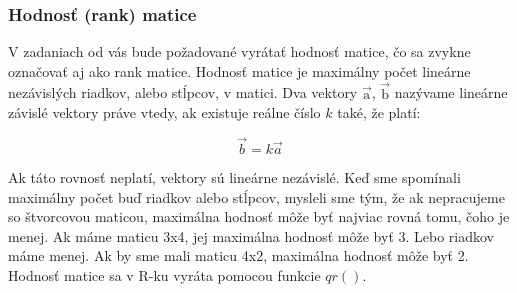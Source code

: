 \documentclass[]{article}
\newenvironment{Shaded}{\begin{snugshade}}{\end{snugshade}}
\newcommand{\CommentTok}[1]{\textcolor[rgb]{0.56,0.35,0.01}{\textit{#1}}}
\newcommand{\DecValTok}[1]{\textcolor[rgb]{0.00,0.00,0.81}{#1}}
\newcommand{\KeywordTok}[1]{\textcolor[rgb]{0.13,0.29,0.53}{\textbf{#1}}}
\newcommand{\NormalTok}[1]{#1}
\newcommand{\OperatorTok}[1]{\textcolor[rgb]{0.81,0.36,0.00}{\textbf{#1}}}
\newcommand{\StringTok}[1]{\textcolor[rgb]{0.31,0.60,0.02}{#1}}
\begin{document}
\hypertarget{hodnosux165-rank-matice}{%
\subsubsection{Hodnosť (rank) matice}\label{hodnosux165-rank-matice}}

V zadaniach od vás bude požadované vyrátať hodnosť matice, čo sa zvykne
označovať aj ako rank matice. Hodnosť matice je maximálny počet lineárne
nezávislých riadkov, alebo stĺpcov, v matici. Dva vektory
\(\overrightarrow{\text{a}}\), \(\overrightarrow{\text{b}}\) nazývame
lineárne závislé vektory práve vtedy, ak existuje reálne číslo \(k\)
také, že platí:

\[\overrightarrow{b} = k\overrightarrow{a}\]

Ak táto rovnosť neplatí, vektory sú lineárne nezávislé. Keď sme
spomínali maximálny počet buď riadkov alebo stĺpcov, mysleli sme tým, že
ak nepracujeme so štvorcovou maticou, maximálna hodnosť môže byť najviac
rovná tomu, čoho je menej. Ak máme maticu 3x4, jej maximálna hodnosť
môže byť 3. Lebo riadkov máme menej. Ak by sme mali maticu 4x2,
maximálna hodnosť môže byť 2. Hodnosť matice sa v R-ku vyráta pomocou
funkcie \(qr()\).

\begin{Shaded}
\end{Shaded}
\end{document}
